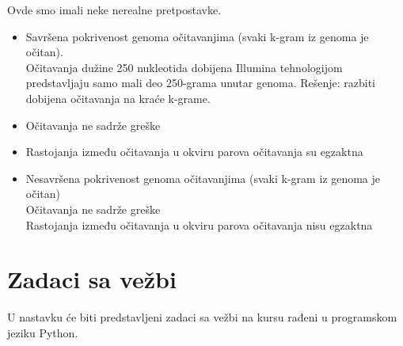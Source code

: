 Ovde smo imali neke nerealne pretpostavke.
\begin{itemize}
	\item  Savršena pokrivenost genoma očitavanjima (svaki k-gram iz genoma je očitan). \\
	Očitavanja dužine 250 nukleotida dobijena Illumina tehnologijom predstavljaju samo mali deo 250-grama unutar genoma. Rešenje: razbiti dobijena očitavanja na kraće k-grame.
	\item Očitavanja ne sadrže greške
	\item Rastojanja između očitavanja u okviru parova očitavanja su egzaktna
	\item Nesavršena pokrivenost genoma očitavanjima (svaki k-gram iz genoma je očitan)
	\\ Očitavanja ne sadrže greške
	\\ Rastojanja između očitavanja u okviru parova očitavanja nisu egzaktna
\end{itemize}


\section{Zadaci sa vežbi}
\setexamplecodestyle

U nastavku će biti predstavljeni zadaci sa vežbi na kursu rađeni u programskom jeziku Python.


